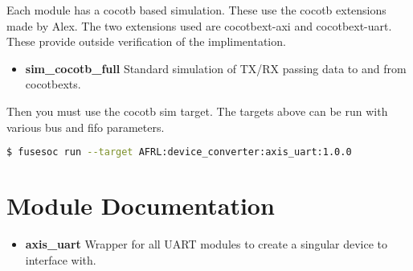 Each module has a cocotb based simulation. These use the cocotb extensions made by Alex.
The two extensions used are cocotbext-axi and cocotbext-uart. These provide outside verification
of the implimentation.

\begin{itemize}
  \item \textbf{sim\_cocotb\_full} Standard simulation of TX/RX passing data to and from cocotbexts.
\end{itemize}

Then you must use the cocotb sim target. The targets above can be run with various bus and fifo parameters.
\begin{lstlisting}[language=bash]
  $ fusesoc run --target AFRL:device_converter:axis_uart:1.0.0
\end{lstlisting}

\newpage

\section{Module Documentation} \label{Module Documentation}

\begin{itemize}
\item \textbf{axis\_uart} Wrapper for all UART modules to create a singular device to interface with.\\
\end{itemize}


